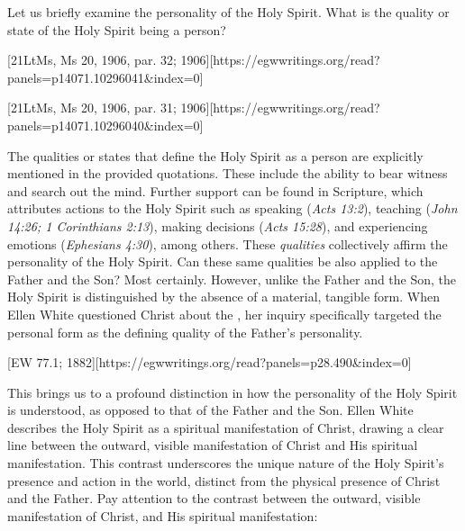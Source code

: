 Let us briefly examine the personality of the Holy Spirit. What is the quality or state of the Holy Spirit being a person?

[21LtMs, Ms 20, 1906, par. 32; 1906][https://egwwritings.org/read?panels=p14071.10296041&index=0]

[21LtMs, Ms 20, 1906, par. 31; 1906][https://egwwritings.org/read?panels=p14071.10296040&index=0]

The qualities or states that define the Holy Spirit as a person are explicitly mentioned in the provided quotations. These include the ability to bear witness and search out the mind. Further support can be found in Scripture, which attributes actions to the Holy Spirit such as speaking (\textit{Acts 13:2}), teaching (\textit{John 14:26; 1 Corinthians 2:13}), making decisions (\textit{Acts 15:28}), and experiencing emotions (\textit{Ephesians 4:30}), among others. These \textit{qualities }collectively affirm the personality of the Holy Spirit. Can these same qualities be also applied to the Father and the Son? Most certainly. However, unlike the Father and the Son, the Holy Spirit is distinguished by the absence of a material, tangible form. When Ellen White questioned Christ about the , her inquiry specifically targeted the personal form as the defining quality of the Father's personality.

[EW 77.1; 1882][https://egwwritings.org/read?panels=p28.490&index=0]

This brings us to a profound distinction in how the personality of the Holy Spirit is understood, as opposed to that of the Father and the Son. Ellen White describes the Holy Spirit as a spiritual manifestation of Christ, drawing a clear line between the outward, visible manifestation of Christ and His spiritual manifestation. This contrast underscores the unique nature of the Holy Spirit's presence and action in the world, distinct from the physical presence of Christ and the Father. Pay attention to the contrast between the outward, visible manifestation of Christ, and His spiritual manifestation:


